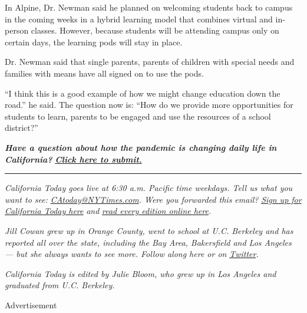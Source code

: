 In Alpine, Dr. Newman said he planned on welcoming students back to
campus in the coming weeks in a hybrid learning model that combines
virtual and in-person classes. However, because students will be
attending campus only on certain days, the learning pods will stay in
place.

Dr. Newman said that single parents, parents of children with special
needs and families with means have all signed on to use the pods.

``I think this is a good example of how we might change education down
the road.'' he said. The question now is: ``How do we provide more
opportunities for students to learn, parents to be engaged and use the
resources of a school district?''

\emph{\textbf{Have a question about how the pandemic is changing daily
life in California?}}
\textbf{\href{https://nl.nytimes3xbfgragh.onion/f/newsletter/RYd0nNn_JZ_1cV4f3uy2gg~~/AAAAAQA~/RgRhIlGqP0TgaHR0cHM6Ly93d3cubnl0aW1lcy5jb20vMjAyMC8wNi8xNy91cy9jb3JvbmF2aXJ1cy1jYWxpZm9ybmlhLWxpZmUuaHRtbD9jYW1wYWlnbl9pZD00OSZlbWM9ZWRpdF9jYV8yMDIwMDgyMSZpbnN0YW5jZV9pZD0yMTQ4OSZubD1jYWxpZm9ybmlhLXRvZGF5JnJlZ2lfaWQ9Njg1MTk1NzMmc2VnbWVudF9pZD0zNjY5NiZ0ZT0xJnVzZXJfaWQ9YWM0Y2EyOTY2ZDMzMTZiMmUyZjZmZmJiNmE1ODQxOTJXA255dEIKACuqzD9f34_zJFIbbWFyaWUubWNkZXJtb3R0QG55dGltZXMuY29tWAQAAAAA}{\emph{Click
here to submit.}}}

\begin{center}\rule{0.5\linewidth}{\linethickness}\end{center}

\emph{California Today goes live at 6:30 a.m. Pacific time weekdays.
Tell us what you want to see:}
\href{mailto:CAtoday@NYTimes.com}{\emph{CAtoday@NYTimes.com}}\emph{.
Were you forwarded this email?}
\href{https://www.nytimes3xbfgragh.onion/newsletters/california-today?module=inline}{\emph{Sign
up for California Today here}} \emph{and}
\href{https://www.nytimes3xbfgragh.onion/column/california-today}{\emph{read
every edition online here}}\emph{.}

\emph{Jill Cowan grew up in Orange County, went to school at U.C.
Berkeley and has reported all over the state, including the Bay Area,
Bakersfield and Los Angeles --- but she always wants to see more. Follow
along here or on}
\href{https://twitter.com/JillCowan}{\emph{Twitter}}\emph{.}

\emph{California Today is edited by Julie Bloom, who grew up in Los
Angeles and graduated from U.C. Berkeley.}

Advertisement

